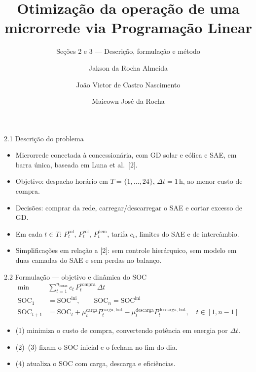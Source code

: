 \documentclass[aspectratio=169,11pt]{beamer}
\title{Otimização da operação de uma microrrede via Programação Linear}
\subtitle{Seções 2 e 3 --- Descrição, formulação e método}
\author{Jakson da Rocha Almeida \and João Victor de Castro Nascimento \and Maicown José da Rocha}
\institute{PPGE / UFJF --- 210143 Métodos de Otimização}
\begin{document}
\begin{frame}{2.1 Descrição do problema}
\begin{itemize}\setlength{\itemsep}{0.45em}
  \item Microrrede conectada à concessionária, com GD solar e eólica e SAE, em barra única, baseada em Luna et al.\ [2].
  \item Objetivo: despacho horário em $T=\{1,\ldots,24\}$, $\Delta t=1\,\mathrm{h}$, ao menor custo de compra.
  \item Decisões: comprar da rede, carregar/descarregar o SAE e cortar excesso de GD.
  \item Em cada $t\in T$: $P_t^{\mathrm{sol}}$, $P_t^{\mathrm{eol}}$, $P_t^{\mathrm{dem}}$, tarifa $c_t$, limites do SAE e de intercâmbio.
  \item Simplificações em relação a [2]: sem controle hierárquico, sem modelo em duas camadas do SAE e sem perdas no balanço.
\end{itemize}
\end{frame}

\begin{frame}{2.2 Formulação --- objetivo e dinâmica do SOC}
\begin{align}
\min &\sum_{t=1}^{n_{\mathrm{horas}}} c_t\, P_t^{\mathrm{compra}}\,\Delta t
\tag{1}\\
\mathrm{SOC}_1 &= \mathrm{SOC}^{\mathrm{ini}},
\qquad
\mathrm{SOC}_n = \mathrm{SOC}^{\mathrm{ini}}
\tag{2,3}\\
\mathrm{SOC}_{t+1}
&= \mathrm{SOC}_t
+ \mu_t^{\mathrm{carga}} P_t^{\mathrm{carga,bat}}
- \mu_t^{\mathrm{descarga}} P_t^{\mathrm{descarga,bat}},
\quad t\in[1,n-1]
\tag{4}
\end{align}
\vspace{-0.4em}
\begin{itemize}\setlength{\itemsep}{0.35em}
  \item (1) minimiza o custo de compra, convertendo potência em energia por $\Delta t$.
  \item (2)--(3) fixam o SOC inicial e o fecham no fim do dia.
  \item (4) atualiza o SOC com carga, descarga e eficiências.
\end{itemize}
\end{frame}
\end{document}
